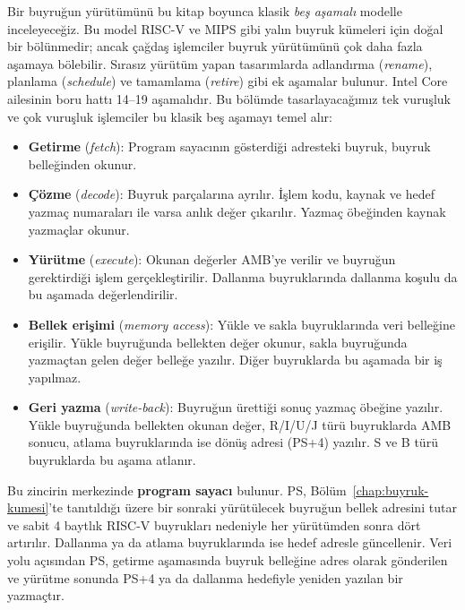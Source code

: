 Bir buyruğun yürütümünü bu kitap boyunca klasik \emph{beş aşamalı} modelle inceleyeceğiz. Bu model RISC-V ve MIPS gibi yalın buyruk kümeleri için doğal bir bölünmedir; ancak çağdaş işlemciler buyruk yürütümünü çok daha fazla aşamaya bölebilir. Sırasız yürütüm yapan tasarımlarda adlandırma (\emph{rename}), planlama (\emph{schedule}) ve tamamlama (\emph{retire}) gibi ek aşamalar bulunur. Intel Core ailesinin boru hattı 14--19 aşamalıdır. Bu bölümde tasarlayacağımız tek vuruşluk ve çok vuruşluk işlemciler bu klasik beş aşamayı temel alır:
\begin{itemize}
    \item \textbf{Getirme} (\emph{fetch}): Program sayacının gösterdiği adresteki buyruk, buyruk belleğinden okunur.
    \item \textbf{Çözme} (\emph{decode}): Buyruk parçalarına ayrılır. İşlem kodu, kaynak ve hedef yazmaç numaraları ile varsa anlık değer çıkarılır. Yazmaç öbeğinden kaynak yazmaçlar okunur.
    \item \textbf{Yürütme} (\emph{execute}): Okunan değerler AMB'ye verilir ve buyruğun gerektirdiği işlem gerçekleştirilir. Dallanma buyruklarında dallanma koşulu da bu aşamada değerlendirilir.
    \item \textbf{Bellek erişimi} (\emph{memory access}): Yükle ve sakla buyruklarında veri belleğine erişilir. Yükle buyruğunda bellekten değer okunur, sakla buyruğunda yazmaçtan gelen değer belleğe yazılır. Diğer buyruklarda bu aşamada bir iş yapılmaz.
    \item \textbf{Geri yazma} (\emph{write-back}): Buyruğun ürettiği sonuç yazmaç öbeğine yazılır. Yükle buyruğunda bellekten okunan değer, R/I/U/J türü buyruklarda AMB sonucu, atlama buyruklarında ise dönüş adresi (PS+4) yazılır. S ve B türü buyruklarda bu aşama atlanır.
\end{itemize}

Bu zincirin merkezinde \textbf{program sayacı} bulunur. PS, Bölüm~\ref{chap:buyruk-kumesi}'te tanıtıldığı üzere bir sonraki yürütülecek buyruğun bellek adresini tutar ve sabit 4 baytlık RISC-V buyrukları nedeniyle her yürütümden sonra dört artırılır. Dallanma ya da atlama buyruklarında ise hedef adresle güncellenir. Veri yolu açısından PS, getirme aşamasında buyruk belleğine adres olarak gönderilen ve yürütme sonunda PS+4 ya da dallanma hedefiyle yeniden yazılan bir yazmaçtır.

